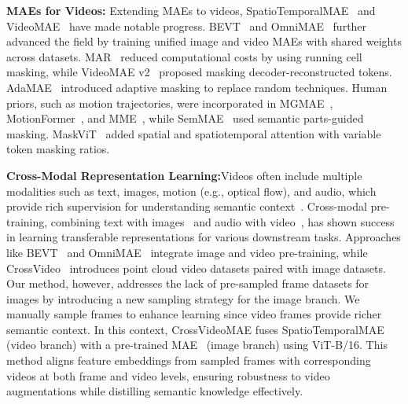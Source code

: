 \noindent \textbf{MAEs for Videos:}
Extending MAEs to videos, SpatioTemporalMAE~\cite{feichtenhofer2022masked} and VideoMAE~\cite{tong2022videomae} have made notable progress. BEVT~\cite{wang2022bevt} and OmniMAE~\cite{girdhar2023omnimae} further advanced the field by training unified image and video MAEs with shared weights across datasets. MAR~\cite{qing2023mar} reduced computational costs by using running cell masking, while VideoMAE v2~\cite{wang2023videomae} proposed masking decoder-reconstructed tokens. AdaMAE~\cite{bandara2023adamae} introduced adaptive masking to replace random techniques. Human priors, such as motion trajectories, were incorporated in MGMAE~\cite{huang2023mgmae}, MotionFormer~\cite{patrick2021keeping}, and MME~\cite{sun2023masked}, while SemMAE~\cite{li2022semmae} used semantic parts-guided masking. MaskViT~\cite{gupta2022maskvit} added spatial and spatiotemporal attention with variable token masking ratios.

\noindent \textbf{Cross-Modal Representation Learning:}Videos often include multiple modalities such as text, images, motion (e.g., optical flow), and audio, which provide rich supervision for understanding semantic context~\cite{desai2021virtex,radford2021learning,sariyildiz2020learning,castrejon2016learning,gong2014improving,karpathy2015deep,lu202012,miech2020end}. Cross-modal pre-training, combining text with images~\cite{desai2021virtex,radford2021learning} and audio with video~\cite{arandjelovic2017look,arandjelovic2018objects,morgado2021robust,morgado2021audio,korbar2018cooperative,owens2018audio}, has shown success in learning transferable representations for various downstream tasks. Approaches like BEVT~\cite{wang2022bevt} and OmniMAE~\cite{girdhar2023omnimae} integrate image and video pre-training, while CrossVideo~\cite{liu2024crossvideo} introduces point cloud video datasets paired with image datasets. Our method, however, addresses the lack of pre-sampled frame datasets for images by introducing a new sampling strategy for the image branch. We manually sample frames to enhance learning since video frames provide richer semantic context. In this context, CrossVideoMAE fuses SpatioTemporalMAE~\cite{feichtenhofer2022masked} (video branch) with a pre-trained MAE~\cite{he2022masked} (image branch) using ViT-B/16. This method aligns feature embeddings from sampled frames with corresponding videos at both frame and video levels, ensuring robustness to video augmentations while distilling semantic knowledge effectively.

